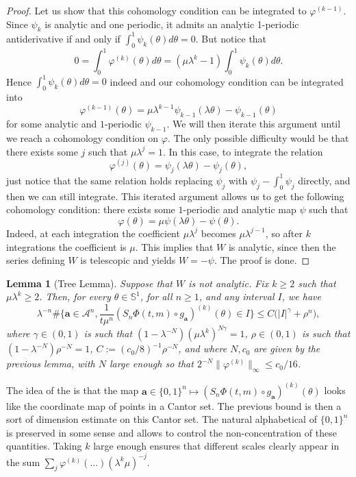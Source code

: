 \documentclass[11pt]{amsart}
\theoremstyle{plain}
\newtheorem{lemma}[theorem]{Lemma}
\theoremstyle{definition}
\numberwithin{equation}{section}
\begin{document}
\begin{proof}
Let us show that this cohomology condition can be integrated to $\varphi^{(k-1)}$. Since $\psi_k$ is analytic and one periodic, it admits an analytic 1-periodic antiderivative if and only if $\int_0^1  \psi_k(\theta)d\theta = 0$. But notice that
$$ 0 = \int_0^1 \varphi^{(k)}(\theta)d\theta = (\mu \lambda^{k} -1) \int_0^1\psi_k(\theta) d\theta. $$
Hence $\int_0^1\psi_k(\theta) d\theta = 0$ indeed and our cohomology condition can be integrated into
$$ \varphi^{(k-1)}(\theta)
= \mu \lambda^{k-1} \psi_{k-1}(\lambda\theta)
- \psi_{k-1}(\theta) $$
for some analytic and $1$-periodic $\psi_{k-1}$. We will then iterate this argument until we reach a cohomology condition on $\varphi$. The only possible difficulty would be that there exists some $j$ such that $\mu \lambda^j=1$. In this case, to integrate the relation $$\varphi^{(j)}(\theta) = \psi_j(\lambda \theta) - \psi_j(\theta),$$ just notice that the same relation holds replacing $\psi_j$ with $\psi_j - \int_0^1 \psi_j$ directly, and then we can still integrate. This iterated argument allows us to get the following cohomology condition: there exists some $1$-periodic and analytic map $\psi$ such that
$$ \varphi(\theta) = \mu \psi(\lambda \theta) - \psi(\theta). $$
Indeed, at each integration the coefficient $\mu\lambda^j$ becomes $\mu\lambda^{j-1}$, so after $k$ integrations the coefficient is $\mu$. This implies that $W$ is analytic, since then the series defining $W$ is telescopic and yields $W=-\psi$. The proof is done.
\end{proof}

\begin{lemma}[Tree Lemma]
Suppose that $W$ is not analytic. Fix $k \geq 2$ such that $\mu \lambda^k \geq 2$. Then, for every $\theta \in \mathbb{S}^1$, for all $n \geq 1$, and any interval $I$, we have
$$
\lambda^{-n} \#\Big\{ \mathbf{a} \in \mathcal{A}^n, \frac{1}{t \mu^n}(S_n \Phi(t,m) \circ g_\mathbf{a})^{(k)}(\theta) \in I \Big\} \leq C\Big( |I|^\gamma + \rho^n \Big),
$$
where $\gamma \in (0,1)$ is such that $(1-\lambda^{-N}) (\mu \lambda^k)^{N\gamma} = 1$, $\rho \in (0,1)$ is such that $(1-\lambda^{-N})\rho^{-N}=1$, $C := (c_0/8)^{-1} \rho^{-N}$, and where $N,c_0$ are given by the previous lemma, with $N$ large enough so that $2^{-N} \|\varphi^{(k)}\|_\infty \leq c_0/16$.
\end{lemma}

The idea of the  is that the map $\mathbf{a} \in \{0,1\}^{n} \mapsto(S_n \Phi(t,m) \circ g_\mathbf{a})^{(k)}(\theta)$ looks like the coordinate map of points in a Cantor set. The previous bound is then a sort of dimension estimate on this Cantor set. The natural alphabetical  of $\{0,1\}^n$ is preserved in some sense and allows to control the non-concentration of these quantities. Taking $k$ large enough ensures that different scales clearly appear in the sum $\sum_j \varphi^{(k)}(\dots) (\lambda^k \mu)^{-j}$.
\end{document}
